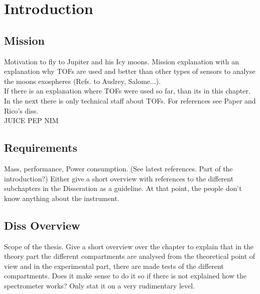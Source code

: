 \section{Introduction}

	\subsection{Mission}
	Motivation to fly to Jupiter and his Icy moons. Mission explanation with an explanation why TOFs are used and better than other types of sensors to analyse the moons exospheres (Refs. to Audrey, Salome...).\\
	If there is an explanation where TOFs were used so far, than its in this chapter. In the next there is only technical staff about TOFs. For references see Paper and Rico's diss.\\
	JUICE PEP NIM\\
	
	\subsection{Requirements}
	Mass, performance, Power consumption. (See latest references. Part of the introduction?)
	Either give a short overview with references to the different subchapters in the Disseration as a guideline. At that point, the people don't know anything about the instrument.
	
	\subsection{Diss Overview} %
	Scope of the thesis. Give a short overview over the chapter to explain that in the theory part the different compartments are analysed from the theoretical point of view and in the experimental part, there are made tests of the different compartments. Does it make sense to do it so if there is not explained how the spectrometer works? Only stat it on a very rudimentary level.	
	
	\begin{comment}
	Planetology depends on simulations but there are also instruments needed to verify the models and set constrains for them. Optical techniques as ultraviolet (UV), visible (VIS), infrared (IR) spectroscopy. On space craft or on earth such as ALMA...
	laser ionization mass spectroscopy (LIMS) for lander to analyse the soil.
	Mass spectrometry has better sensitivity because there single atoms are counted 
	
	\end{comment}
		
	\begin{comment}
		Why a TOF compared to other types of mass spectrometers such as sector magnets or quadrupols.Costumisatoin to the needs of the of the mission (GC for NGMS).
		Improvement in the electronics.
	\end{comment}
	
	
	
	
	
	
	
	
	
	
	
	
	
	
	
	
